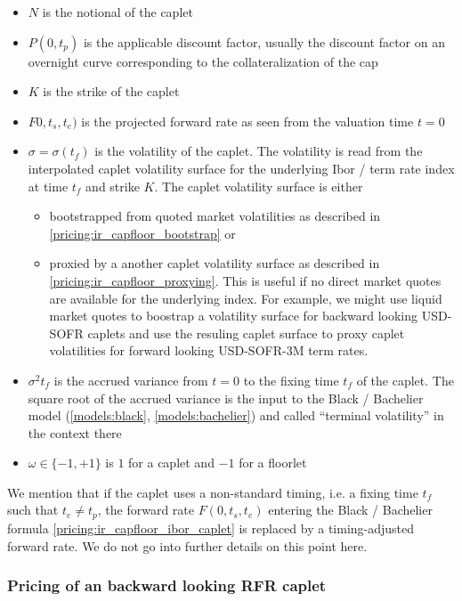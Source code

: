 \begin{itemize}
\item $N$ is the notional of the caplet
\item $P(0,t_p)$ is the applicable discount factor, usually the discount factor on an overnight curve corresponding to
  the collateralization of the cap
\item $K$ is the strike of the caplet
\item $F0,t_s,t_e)$ is the projected forward rate as seen from the valuation time $t=0$
\item $\sigma = \sigma(t_f)$ is the volatility of the caplet. The volatility is read from the interpolated caplet
  volatility surface for the underlying Ibor / term rate index at time $t_f$ and strike $K$. The caplet volatility
  surface is either
   \begin{itemize}
   \item bootstrapped from quoted market volatilities as described in \ref{pricing:ir_capfloor_bootstrap} or
   \item proxied by a another caplet volatility surface as described in \ref{pricing:ir_capfloor_proxying}. This is
     useful if no direct market quotes are available for the underlying index. For example, we might use liquid market
     quotes to boostrap a volatility surface for backward looking USD-SOFR caplets and use the resuling caplet surface
     to proxy caplet volatilities for forward looking USD-SOFR-3M term rates.
   \end{itemize}
\item $\sigma^2 t_f$ is the accrued variance from $t=0$ to the fixing time $t_f$ of the caplet. The square root of the
  accrued variance is the input to the Black / Bachelier model (\ref{models:black}, \ref{models:bachelier}) and called
  ``terminal volatility'' in the context there
\item $\omega \in \{-1,+1\}$ is $1$ for a caplet and $-1$ for a floorlet
\end{itemize}

We mention that if the caplet uses a non-standard timing, i.e. a fixing time $t_f$ such that $t_e \neq t_p$, the forward
rate $F(0,t_s,t_e)$ entering the Black / Bachelier formula \ref{pricing:ir_capfloor_ibor_caplet} is replaced by a
timing-adjusted forward rate. We do not go into further details on this point here.

\subsubsection{Pricing of an backward looking RFR caplet}

